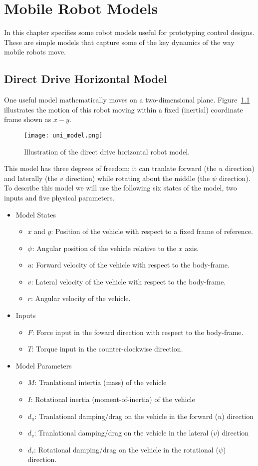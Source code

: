 \chapter{Mobile Robot Models}\label{c:models}
In this chapter specifies some robot models useful for prototyping control designs.  These are simple models that capture some of the key dynamics of the way mobile robots move.  
\section{Direct Drive Horizontal Model}
One useful model mathematically moves on a two-dimensional plane.  Figure~\ref{f:uni_model} illustrates the motion of this robot moving within a fixed (inertial) coordinate frame shown as $x-y$.
\begin{figure}[hbt]
\centering
\texttt{[image: uni\_model.png]}
\caption{Illustration of the direct drive horizontal robot model.}
\label{f:uni_model}
\end{figure}

This model has three degrees of freedom; it can tranlate forward (the $u$ direction) and laterally (the $v$ direction) while rotating about the middle (the $\psi$ direction).  To describe this model we will use the following six states of the model, two inputs and five physical parameters.
\begin{itemize}
\item Model States
\begin{itemize}
\item $x$ and $y$: Position of the vehicle with respect to a fixed frame of reference.
\item $\psi$: Angular position of the vehicle relative to the $x$ axis.
\item $u$: Forward velocity of the vehicle with respect to the body-frame.
\item $v$: Lateral velocity of the vehicle with respect to the body-frame.
\item $r$: Angular velocity of the vehicle.
\end{itemize}
\item Inputs
\begin{itemize}
\item $F$: Force input in the foward direction with respect to the body-frame.
\item $T$: Torque input in the counter-clockwise direction.
\end{itemize}
\item Model Parameters
\begin{itemize}
\item $M$: Tranlational intertia (mass) of the vehicle
\item $I$: Rotational inertia (moment-of-inertia) of the vehicle
\item $d_u$: Tranlational damping/drag on the vehicle in the forward ($u$) direction
\item $d_v$: Tranlational damping/drag on the vehicle in the lateral ($v$) direction
\item $d_r$: Rotational damping/drag on the vehicle in the rotational ($\psi$) direction.
\end{itemize}
\end{itemize}

